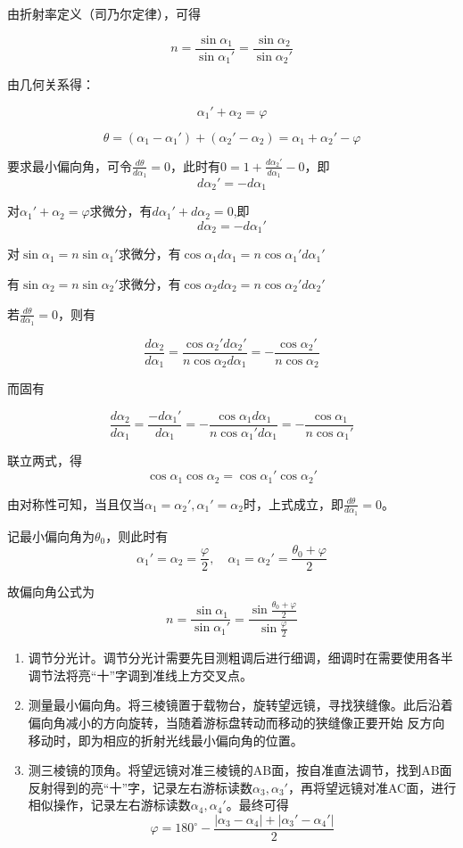 \documentclass[UTF-8, a4paper, 12pt]{ctexart}
\begin{document}
    由折射率定义（司乃尔定律），可得

    $$n = \frac{\sin \alpha_1}{\sin \alpha_1'} = \frac{\sin \alpha_2}{\sin \alpha_2'}$$

    由几何关系得：

    $$\alpha_1' + \alpha_2 = \varphi$$

    $$\theta = (\alpha_1 - \alpha_1') + (\alpha_2' - \alpha_2) = \alpha_1 + \alpha_2' - \varphi$$

    要求最小偏向角，可令$\frac{d\theta}{d\alpha_1} = 0$，此时有$0 = 1 + \frac{d\alpha_2'}{d\alpha_1} - 0$，即$$d\alpha_2' = -d\alpha_1$$

    对$\alpha_1' + \alpha_2 = \varphi$求微分，有$d\alpha_1' + d\alpha_2 = 0$,即$$d\alpha_2 = -d\alpha_1'$$

    对$\sin \alpha_1 = n \sin \alpha_1'$求微分，有$\cos \alpha_1 d\alpha_1 = n \cos \alpha_1' d\alpha_1'$

    有$\sin \alpha_2 = n \sin \alpha_2'$求微分，有$\cos \alpha_2 d \alpha_2 = n \cos \alpha_2' d\alpha_2'$

    若$\frac{d\theta}{d\alpha_1} = 0$，则有

    $$\frac{d\alpha_2}{d\alpha_1} = \frac{\cos \alpha_2' d\alpha_2'}{n\cos \alpha_2 d\alpha_1} = -\frac{\cos \alpha_2'}{n\cos \alpha_2}$$

    而固有

    $$\frac{d\alpha_2}{d\alpha_1} = \frac{-d\alpha_1'}{d\alpha_1} = -\frac{\cos \alpha_1 d\alpha_1}{n\cos \alpha_1' d\alpha_1} = -\frac{\cos \alpha_1}{n\cos \alpha_1'}$$
    
    联立两式，得$$\cos \alpha_1 \cos \alpha_2 = \cos \alpha_1' \cos \alpha_2'$$

    由对称性可知，当且仅当$\alpha_1 = \alpha_2', \alpha_1' = \alpha_2$时，上式成立，即$\frac{d\theta}{d\alpha_1} = 0$。

    记最小偏向角为$\theta_0$，则此时有$$\alpha_1' = \alpha_2 = \frac{\varphi}{2},\quad  \alpha_1 = \alpha_2' = \frac{\theta_0 + \varphi}{2}$$

    故偏向角公式为$$n = \frac{\sin \alpha_1}{\sin \alpha_1'} = \frac{\sin \frac{\theta_0 + \varphi}{2}}{\sin \frac{\varphi}{2}}$$

    \textbf{ }

    \songti

    \begin{enumerate}[（1）]
        \item 调节分光计。调节分光计需要先目测粗调后进行细调，细调时在需要使用各半调节法将亮“十”字调到准线上方交叉点。
        \item 测量最小偏向角。将三棱镜置于载物台，旋转望远镜，寻找狭缝像。此后沿着偏向角减小的方向旋转，当随着游标盘转动而移动的狭缝像正要开始 反方向移动时，即为相应的折射光线最小偏向角的位置。
        \item 测三棱镜的顶角。将望远镜对准三棱镜的AB面，按自准直法调节，找到AB面反射得到的亮“十”字，记录左右游标读数$\alpha_3, \alpha_3'$，再将望远镜对准AC面，进行相似操作，记录左右游标读数$\alpha_4, \alpha_4'$。最终可得$$\varphi = 180^\circ - \frac{|\alpha_3 - \alpha_4| + |\alpha_3' - \alpha_4'|}{2}$$
    \end{enumerate}
\end{document}
